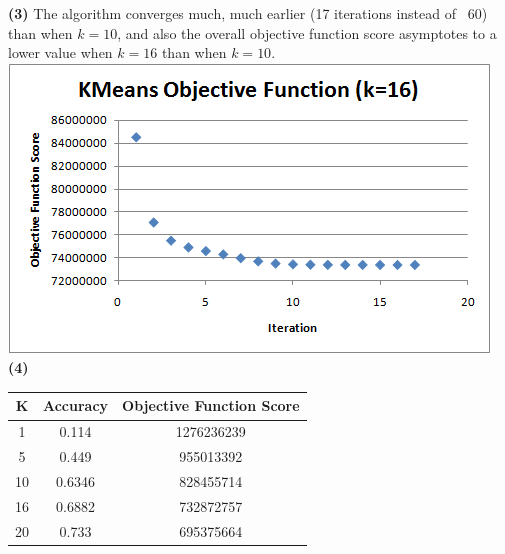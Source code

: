 \documentclass[11pt]{article}
\renewcommand{\part}[1] {\vspace{.10in} {\bf (#1)}}
\begin{document}
\part{3}
The algorithm converges much, much earlier (17 iterations instead of ~60) than when $k=10$, and also the overall objective function score asymptotes to a lower value when $k=16$ than when $k=10$.\\
\includegraphics{q4c.png}\\

\part{4}

    \begin{tabular}{|c|c|c|}
        \hline
        K  & Accuracy & Objective Function Score \\ \hline
        1  & 0.114    & 1276236239               \\ 
        5  & 0.449    & 955013392                \\ 
        10 & 0.6346   & 828455714                \\ 
        16 & 0.6882   & 732872757                \\ 
        20 & 0.733    & 695375664                \\
        \hline
    \end{tabular}
\end{document}
